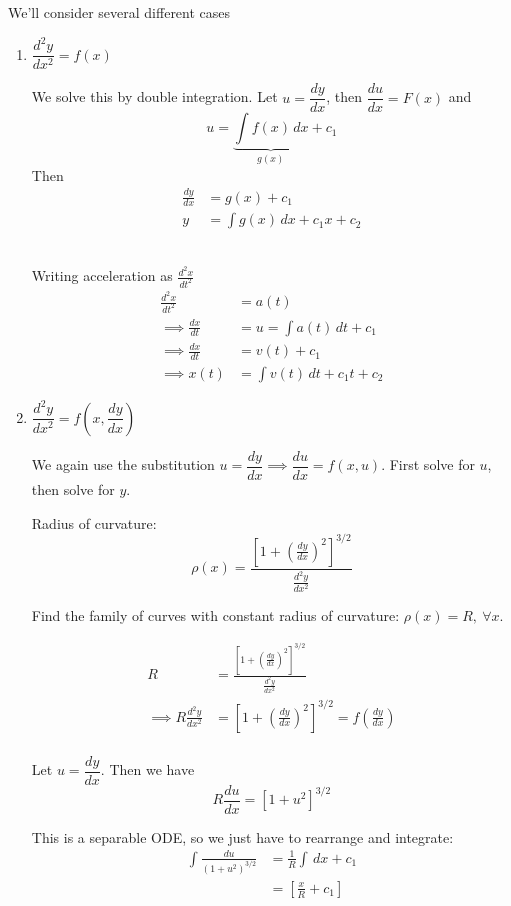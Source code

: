 \documentclass[10pt]{scrartcl}
\begin{document}
We'll consider several different cases
\begin{enumerate}[(1)]
\item $\dfrac{d^2y}{dx^2} = f(x)$

We solve this by double integration. Let $u = \dfrac{dy}{dx}$, then $\dfrac{du}{dx} = F(x)$ and
\[u = \underbrace{\int f(x)\,dx}_{g(x)} + c_1\]
Then 
\[\begin{aligned}\frac{dy}{dx} &= g(x) + c_1\\
y &= \int g(x)\,dx + c_1x + c_2	
\end{aligned}
\]~

\begin{example}[Mechanics] Writing acceleration as $\frac{d^2x}{dt^2}$
	\[
\begin{aligned}
  \frac{d^2x}{dt^2} &= a(t)\\[.2cm]
\implies   \frac{dx}{dt} &= u = \int a(t)\,dt + c_1\\[.2cm]
\implies  \frac{dx}{dt} &= v(t) + c_1\\[.2cm]
\implies   x(t) &= \int v(t)\,dt + c_1t + c_2
\end{aligned}
\]
\end{example}

\item $\dfrac{d^2y}{dx^2} = f\left(x,\dfrac{dy}{dx}\right)$

We again use the substitution $u = \dfrac{dy}{dx} \implies \dfrac{du}{dx} = f(x,u).$ First solve for $u$, then solve for $y.$\\[.2cm]

\begin{example}[Geometry]
Radius of curvature: 
\[\rho(x) = \frac{\left[1 + \left(\frac{dy}{dx}\right)^2\right]^{3/2}}{\frac{d^2y}{dx^2}}\]

Find the family of curves with constant radius of curvature: $\rho(x) = R,~\forall x$. 

\[
\begin{aligned}
  R &= \frac{\left[1 + \left(\frac{dy}{dx}\right)^2\right]^{3/2}}{\frac{d^2y}{dx^2}}\\[.3cm]
\implies   R\frac{d^2y}{dx^2} &= \left[1 + \left(\frac{dy}{dx}\right)^2\right]^{3/2} = f\left(\frac{dy}{dx}\right)\\
\end{aligned}
\]

Let $u = \dfrac{dy}{dx}$. Then we have
\[R\frac{du}{dx} = [1 + u^2]^{3/2}\]

This is a separable ODE, so we just have to rearrange and integrate: 
\begin{align*}
	\int \frac{du}{(1+u^2)^{3/2}} &= \frac{1}{R}\int \,dx + c_1\\[.2cm]
	&= \left[\frac{x}{R} + c_1\right]
\end{align*}


\end{example}
\end{enumerate}
\end{document}
